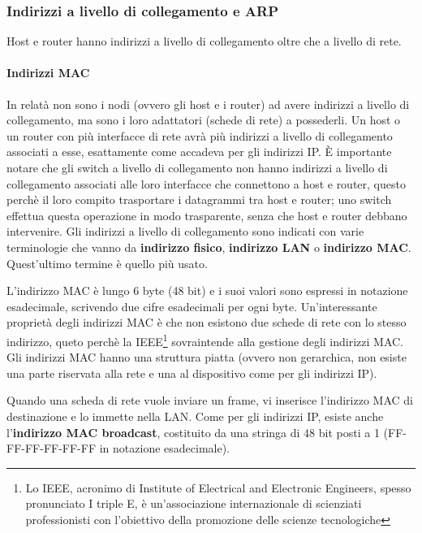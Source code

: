 \documentclass[11pt,a4paper]{article}
\begin{document}
\subsubsection{Indirizzi a livello di collegamento e ARP}
Host e router hanno indirizzi a livello di collegamento oltre che a livello di rete.
\paragraph{Indirizzi MAC}
In relatà non sono i nodi (ovvero gli host e i router) ad avere indirizzi a livello di collegamento, ma sono i loro adattatori (schede di rete) a possederli. Un host o un router con più interfacce di rete avrà più indirizzi a livello di collegamento associati a esse, esattamente come accadeva per gli indirizzi IP. È importante notare che gli switch a livello di collegamento non hanno indirizzi a livello di collegamento associati alle loro interfacce che connettono a host e router, questo perchè il loro compito  trasportare i datagrammi tra host e router; uno switch effettua questa operazione in modo trasparente, senza che host e router debbano intervenire. Gli indirizzi a livello di collegamento sono indicati con varie terminologie che vanno da \textbf{indirizzo fisico}, \textbf{indirizzo LAN} o \textbf{indirizzo MAC}. Quest'ultimo termine è quello più usato.

L'indirizzo MAC è lungo 6 byte (48 bit) e i suoi valori sono espressi in notazione esadecimale, scrivendo due cifre esadecimali per ogni byte. Un'interessante proprietà degli indirizzi MAC è che non esistono due schede di rete con lo stesso indirizzo, queto perchè la IEEE\footnote{Lo IEEE, acronimo di Institute of Electrical and Electronic Engineers, spesso pronunciato I triple E, è un'associazione internazionale di scienziati professionisti con l'obiettivo della promozione delle scienze tecnologiche} sovraintende alla gestione degli indirizzi MAC. Gli indirizzi MAC hanno una struttura piatta (ovvero non gerarchica, non esiste una parte riservata alla rete e una al dispositivo come per gli indirizzi IP).

Quando una scheda di rete vuole inviare un frame, vi inserisce l'indirizzo MAC di destinazione e lo immette nella LAN. Come per gli indirizzi IP, esiste anche l'\textbf{indirizzo MAC broadcast}, costituito da una stringa di 48 bit posti a 1 (FF-FF-FF-FF-FF-FF in notazione esadecimale).
\end{document}
